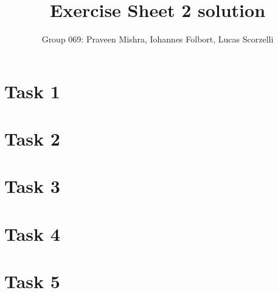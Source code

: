 \documentclass[
	11pt, 
	DIV10,
	a4paper, 
	oneside, 
	headings=normal, 
	captions=tableheading,
	final, 
	numbers=noenddot
]{scrartcl}
\title{Exercise Sheet 2 solution}
\author{Group 069: Praveen Mishra, Iohannes Folbort, Lucas Scorzelli}
\begin{document}
\maketitle
\newpage



\section*{Task 1}

\newpage

\section*{Task 2}

\newpage

\section*{Task 3}

\newpage

\section*{Task 4}

\newpage

\section*{Task 5}

\newpage
\end{document}
